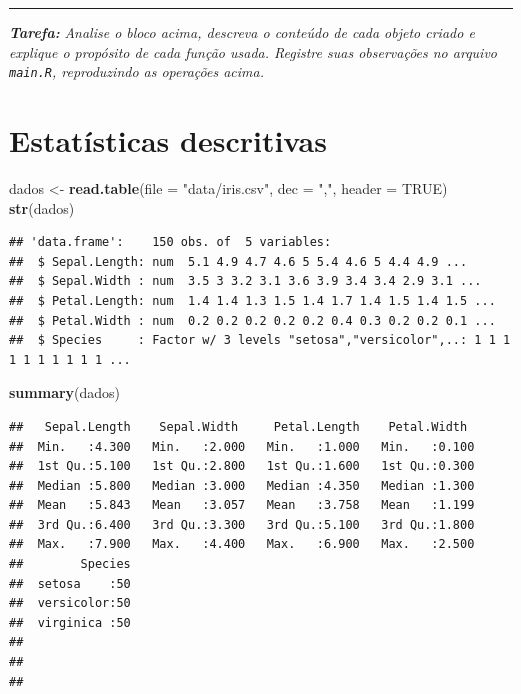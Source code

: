 \documentclass[
]{book}
\newenvironment{Shaded}{\begin{snugshade}}{\end{snugshade}}
\newcommand{\DataTypeTok}[1]{\textcolor[rgb]{0.13,0.29,0.53}{#1}}
\newcommand{\KeywordTok}[1]{\textcolor[rgb]{0.13,0.29,0.53}{\textbf{#1}}}
\newcommand{\NormalTok}[1]{#1}
\newcommand{\OtherTok}[1]{\textcolor[rgb]{0.56,0.35,0.01}{#1}}
\newcommand{\StringTok}[1]{\textcolor[rgb]{0.31,0.60,0.02}{#1}}
\begin{document}
\begin{center}\rule{0.5\linewidth}{0.5pt}\end{center}

\textbf{\emph{Tarefa:}} \emph{Analise o bloco acima, descreva o conteúdo de cada objeto criado e explique o propósito de cada função usada. Registre suas observações no arquivo \texttt{main.R}, reproduzindo as operações acima.}

\hypertarget{estatuxedsticas-descritivas}{%
\chapter{Estatísticas descritivas}\label{estatuxedsticas-descritivas}}

\begin{Shaded}
\begin{Highlighting}[]
\NormalTok{dados <-}\StringTok{ }\KeywordTok{read.table}\NormalTok{(}\DataTypeTok{file =} \StringTok{"data/iris.csv"}\NormalTok{, }\DataTypeTok{dec =} \StringTok{","}\NormalTok{, }\DataTypeTok{header =} \OtherTok{TRUE}\NormalTok{)}
\KeywordTok{str}\NormalTok{(dados)}
\end{Highlighting}
\end{Shaded}

\begin{verbatim}
## 'data.frame':    150 obs. of  5 variables:
##  $ Sepal.Length: num  5.1 4.9 4.7 4.6 5 5.4 4.6 5 4.4 4.9 ...
##  $ Sepal.Width : num  3.5 3 3.2 3.1 3.6 3.9 3.4 3.4 2.9 3.1 ...
##  $ Petal.Length: num  1.4 1.4 1.3 1.5 1.4 1.7 1.4 1.5 1.4 1.5 ...
##  $ Petal.Width : num  0.2 0.2 0.2 0.2 0.2 0.4 0.3 0.2 0.2 0.1 ...
##  $ Species     : Factor w/ 3 levels "setosa","versicolor",..: 1 1 1 1 1 1 1 1 1 1 ...
\end{verbatim}

\begin{Shaded}
\begin{Highlighting}[]
\KeywordTok{summary}\NormalTok{(dados)}
\end{Highlighting}
\end{Shaded}

\begin{verbatim}
##   Sepal.Length    Sepal.Width     Petal.Length    Petal.Width   
##  Min.   :4.300   Min.   :2.000   Min.   :1.000   Min.   :0.100  
##  1st Qu.:5.100   1st Qu.:2.800   1st Qu.:1.600   1st Qu.:0.300  
##  Median :5.800   Median :3.000   Median :4.350   Median :1.300  
##  Mean   :5.843   Mean   :3.057   Mean   :3.758   Mean   :1.199  
##  3rd Qu.:6.400   3rd Qu.:3.300   3rd Qu.:5.100   3rd Qu.:1.800  
##  Max.   :7.900   Max.   :4.400   Max.   :6.900   Max.   :2.500  
##        Species  
##  setosa    :50  
##  versicolor:50  
##  virginica :50  
##                 
##                 
## 
\end{verbatim}
\end{document}
